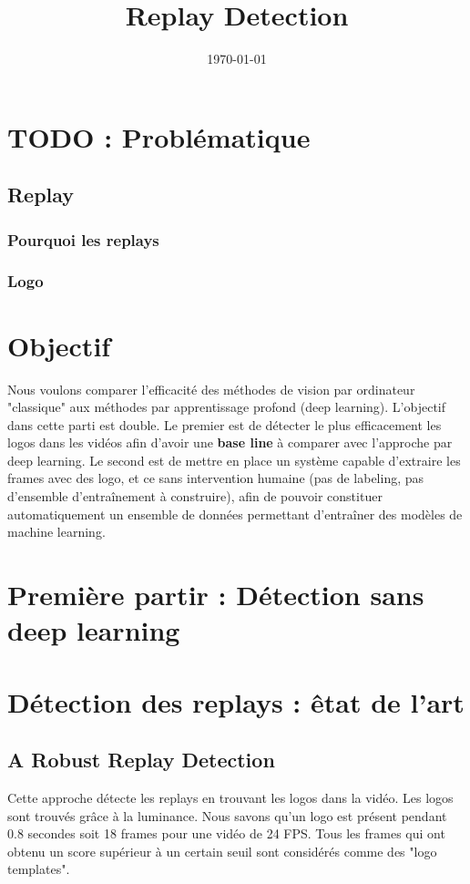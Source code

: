 \documentclass[11pt]{article}
\date{\today}
\title{Replay Detection}
\begin{document}
\maketitle
\tableofcontents



\section{{\bfseries\sffamily TODO} : Problématique}
\label{sec-1}
\subsection{Replay}
\label{sec-1-1}
\subsubsection{Pourquoi les replays}
\label{sec-1-1-1}
\subsubsection{Logo}
\label{sec-1-1-2}

\section{Objectif}
\label{sec-2}
Nous voulons comparer l'efficacité des méthodes de vision par ordinateur "classique"
aux méthodes par apprentissage profond (deep learning).
L'objectif dans cette parti est double. Le premier est de détecter le plus efficacement les
logos dans les vidéos afin d'avoir une \textbf{base line} à comparer avec l'approche par deep learning. 
Le second est de mettre en place un système capable d'extraire les
frames avec des logo, et ce sans intervention humaine (pas de labeling, pas d'ensemble d'entraînement
à construire), afin de pouvoir constituer automatiquement un ensemble de données permettant d'entraîner
des modèles de machine learning.


\section{Première partir : Détection sans deep learning}
\label{sec-3}
\section{Détection des replays : êtat de l'art}
\label{sec-4}
\subsection{A Robust Replay Detection}
\label{sec-4-1}
Cette approche détecte les replays en trouvant les logos dans la vidéo.
Les logos sont trouvés grâce à la luminance. Nous savons qu'un logo est présent pendant 0.8 secondes soit 18 frames pour une vidéo de 24 FPS. 
Tous les frames qui ont obtenu un score supérieur à un certain seuil sont considérés comme des "logo templates".
\end{document}
